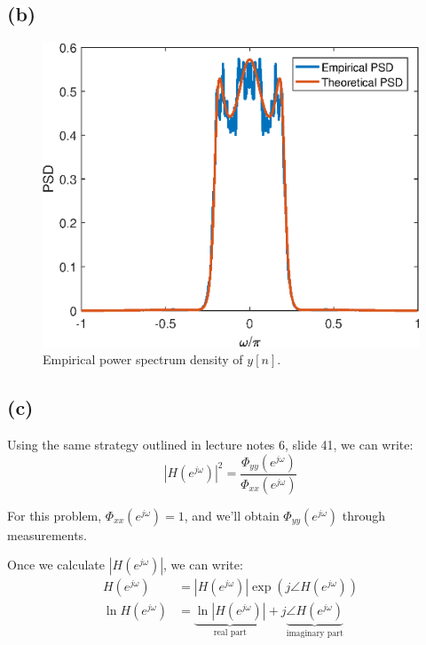 \documentclass{article}
\begin{document}
\subsection{(b)}

\FloatBarrier
\begin{figure}[h!]
	\centering
	\includegraphics[scale=0.7]{figs/hw04_q3b_emp_psd.eps}
	\caption{Empirical power spectrum density of $y[n]$.}
\end{figure}
\FloatBarrier


\subsection{(c)}
Using the same strategy outlined in lecture notes 6, slide 41, we can write:
\begin{equation}
|H(e^{j\omega})|^2 = \frac{\Phi_{yy}(e^{j\omega})}{\Phi_{xx}(e^{j\omega})}
\end{equation}

For this problem, $\Phi_{xx}(e^{j\omega}) = 1$, and we'll obtain $\Phi_{yy}(e^{j\omega})$ through measurements. 

Once we calculate $|H(e^{j\omega})|$, we can write:
\begin{align*}
H(e^{j\omega}) &= |H(e^{j\omega})|\exp(j\angle H(e^{j\omega})) \\
\ln H(e^{j\omega}) &= \underbrace{\ln |H(e^{j\omega})|}_{\text{real part}} + j\underbrace{\angle H(e^{j\omega})}_{\text{imaginary part}} \tag{taking the $\ln$ of both sides}
\end{align*}
\end{document}
